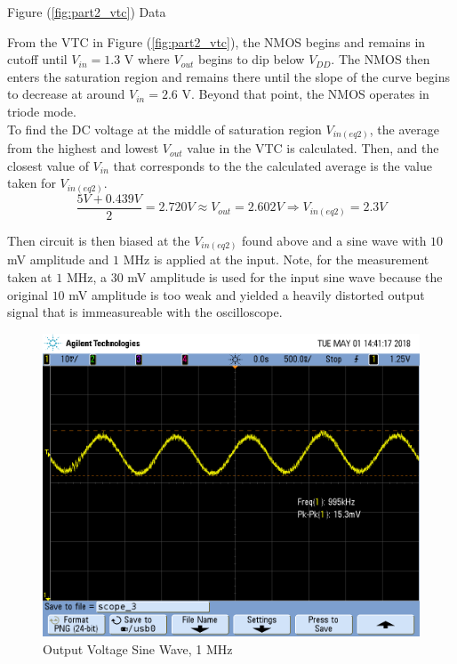 \FloatBarrier

\begin{table}[h!]
	\centering
	\caption{Figure (\ref{fig:part2_vtc}) Data}
	\label{tab:part2_vtc}
\end{table}

\FloatBarrier

From the VTC in Figure (\ref{fig:part2_vtc}), the NMOS begins and remains in cutoff until $V_{in} = 1.3$ \si{\volt} where $V_{out}$ begins to dip below $V_{DD}$.
The NMOS then enters the saturation region and remains there until the slope of the curve begins to decrease at around $V_{in} = 2.6$ \si{\volt}.
Beyond that point, the NMOS operates in triode mode. \\

To find the DC voltage at the middle of saturation region $V_{in(eq2)}$, the average from the highest and lowest $V_{out}$ value in the VTC is calculated.
Then, and the closest value of $V_{in}$ that corresponds to the the calculated average is the value taken for $V_{in(eq2)}$. \\

\begin{equation}
	\label{eq:v_in_eq2}
	\frac{5 V + 0.439 V}{2} = 2.720 V \approx V_{out} = 2.602 V \Rightarrow V_{in(eq2)} = 2.3 V
\end{equation}

Then circuit is then biased at the $V_{in(eq2)}$ found above and a sine wave with $10$ \si{\milli\volt} amplitude and $1$ \si{\mega\hertz} is applied at the input. Note, for the measurement taken at $1$ \si{\mega\hertz}, a $30$ \si{\milli\volt} amplitude is used for the input sine wave because the original $10$ \si{\milli\volt} amplitude is too weak and yielded a heavily distorted output signal that is immeasureable with the oscilloscope.

\FloatBarrier

\begin{figure}[h!]
	\centering
	\includegraphics[scale=0.3]{./images/SCOPE_3.PNG}
	\caption{Output Voltage Sine Wave, 1 \si{\mega\hertz}}
	\label{fig:1mhz_original}
\end{figure}


